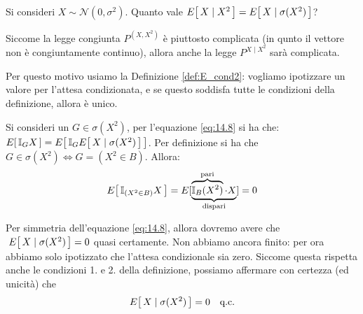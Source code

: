 \begin{esempio}
    Si consideri $X\sim \mathcal{N}(0, \sigma^2)$. Quanto vale $E\!\left[\,X\mid X^2\,\right] = E\!\left[\,X\mid \sigma(X^2)\,\right]$?

    \medskip
    \noindent Siccome la legge congiunta $P^{(X, X^2)}$ è piuttosto complicata (in qunto il vettore non è congiuntamente continuo), allora anche la legge $P^{X\mid X^2}$ sarà complicata.
    
    \medskip
    \noindent Per questo motivo usiamo la Definizione \ref{def:E_cond2}: vogliamo ipotizzare un valore per l'attesa condizionata, e se questo soddisfa tutte le condizioni della definizione, allora è unico.

    \medskip
    Si consideri un $G\in \sigma(X^2)$, per l'equazione \eqref{eq:14.8} si ha che: $E\!\left[\,\mathbb{I}_G X\,\right] = E\!\left[\,\mathbb{I}_G E\!\left[\,X\mid\sigma(X^2)\,\right]\,\right]$. Per definizione si ha che $G\in \sigma(X^2) \iff G = (X^2\in B)$. Allora:
    \begin{align*}
        E\!\left[\,\mathbb{I}_{(X^2\in B)}X\,\right] = E[\underbrace{\overbrace{\mathbb{I}_B(X^2)}^{\text{pari}}\cdot X}_{\text{dispari}}] = 0
    \end{align*}

    Per simmetria dell'equazione \eqref{eq:14.8}, allora dovremo avere che $\;E\!\left[\,X\mid \sigma(X^2)\,\right] = 0$ quasi certamente. Non abbiamo ancora finito: per ora abbiamo solo ipotizzato che l'attesa condizionale sia zero. Siccome questa rispetta anche le condizioni 1. e 2. della definizione, possiamo affermare con certezza (ed unicità) che 
    \[E\!\left[\,X\mid \sigma(X^2)\,\right] = 0\quad\text{q.c.}\]
\end{esempio}

